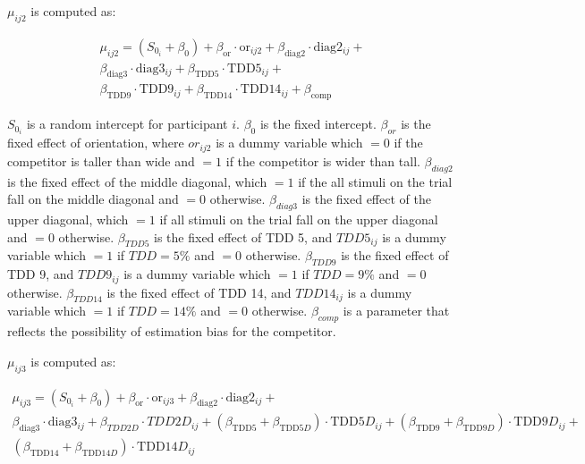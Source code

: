 $\mu_{ij2}$ is computed as:

\begin{equation}
    \begin{aligned}
    \mu_{ij2}=(S_{0_i} + \beta_{0}) + \beta_{\mathrm{or}} \cdot \mathrm{or}_{ij2} + \beta_{\mathrm{diag}2} \cdot \mathrm{diag}2_{ij}+ \\\beta_{\mathrm{diag}3} \cdot \mathrm{diag}3_{ij} + \beta_{\mathrm{TDD}5} \cdot \mathrm{TDD}5_{ij} + \\\beta_{\mathrm{TDD}9} \cdot \mathrm{TDD}9_{ij} + \beta_{\mathrm{TDD}14} \cdot \mathrm{TDD}14_{ij} + \beta_{\mathrm{comp}}
    \label{circle_mu_eqn2}
    \end{aligned}
\end{equation}

$S_{0_i}$ is a random intercept for participant $i$. $\beta_{0}$ is the fixed intercept. $\beta_{or}$ is the fixed effect of orientation, where $or_{ij2}$ is a dummy variable which $=0$ if the competitor is taller than wide and $=1$ if the competitor is wider than tall. $\beta_{diag2}$ is the fixed effect of the middle diagonal, which $=1$ if the all stimuli on the trial fall on the middle diagonal and $=0$ otherwise. $\beta_{diag3}$ is the fixed effect of the upper diagonal, which $=1$ if all stimuli on the trial fall on the upper diagonal and $=0$ otherwise. $\beta_{TDD5}$ is the fixed effect of TDD 5, and $TDD5_{ij}$ is a dummy variable which $=1$ if $TDD=5\%$ and $=0$ otherwise. $\beta_{TDD9}$ is the fixed effect of TDD 9, and $TDD9_{ij}$ is a dummy variable which $=1$ if $TDD=9\%$ and $=0$ otherwise. $\beta_{TDD14}$ is the fixed effect of TDD 14, and $TDD14_{ij}$ is a dummy variable which $=1$ if $TDD=14\%$ and $=0$ otherwise. $\beta_{comp}$ is a parameter that reflects the possibility of estimation bias for the competitor.

$\mu_{ij3}$ is computed as:

\begin{equation}
    \begin{aligned}
    \mu_{ij3}=(S_{0_i} + \beta_{0}) + \beta_{\mathrm{or}} \cdot \mathrm{or}_{ij3} + \beta_{\mathrm{diag}2} \cdot \mathrm{diag}2_{ij}+ \\\beta_{\mathrm{diag}3} \cdot \mathrm{diag}3_{ij} + 
    \beta_{TDD2D} \cdot TDD2D_{ij} + (\beta_{\mathrm{TDD}5} + \beta_{\mathrm{TDD}5D}) \cdot \mathrm{TDD}5D_{ij} + (\beta_{\mathrm{TDD}9} + \beta_{\mathrm{TDD}9D}) \cdot \mathrm{TDD}9D_{ij} +\\ (\beta_{\mathrm{TDD}14} + \beta_{\mathrm{TDD}14D}) \cdot \mathrm{TDD}14D_{ij}
    \end{aligned}
    \label{circle_mu_eqn3}
\end{equation}

